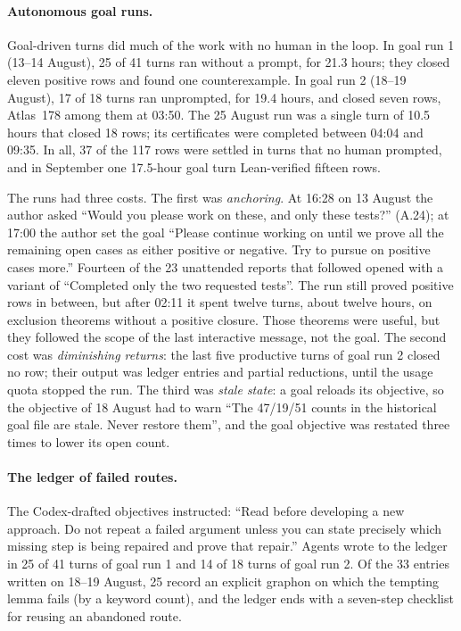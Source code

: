 \documentclass[11pt,a4paper]{article}
\begin{document}
\paragraph{Autonomous goal runs.} Goal-driven turns did much of the work with no human in the loop. In goal run
1 (13--14 August), 25 of 41 turns ran without a prompt, for 21.3 hours; they closed eleven positive rows and
found one counterexample. In goal run 2 (18--19 August), 17 of 18 turns ran unprompted, for 19.4 hours, and
closed seven rows, Atlas~178 among them at 03:50. The 25 August run was a single turn of 10.5 hours that closed
18 rows; its certificates were completed between 04:04 and 09:35. In all, 37 of the 117 rows were settled in
turns that no human prompted, and in September one 17.5-hour goal turn Lean-verified fifteen rows.

The runs had three costs. The first was \emph{anchoring}. At 16:28 on 13 August the author asked ``Would you
please work on these, and only these tests?'' (A.24); at 17:00 the author set the goal ``Please continue working
on until we prove all the remaining open cases as either positive or negative. Try to pursue on positive cases
more.'' Fourteen of the 23 unattended reports that followed opened with a variant of ``Completed only the two
requested tests''. The run still proved positive rows in between, but after 02:11 it spent twelve turns, about
twelve hours, on exclusion theorems without a positive closure. Those theorems were useful, but they followed
the scope of the last interactive message, not the goal. The second cost was \emph{diminishing returns}: the
last five productive turns of goal run 2 closed no row; their output was ledger entries and partial reductions,
until the usage quota stopped the run. The
third was \emph{stale state}: a goal reloads its objective, so the objective of 18 August had to warn ``The
47/19/51 counts in the historical goal file are stale. Never restore them'', and the goal objective was
restated three times to lower its open count.

\paragraph{The ledger of failed routes.} The Codex-drafted objectives instructed: ``Read
 before developing a new approach. Do not repeat a failed argument unless you
can state precisely which missing step is being repaired and prove that repair.'' Agents wrote to the ledger in
25 of 41 turns of goal run 1 and 14 of 18 turns of goal run 2. Of the 33 entries written on 18--19 August, 25
record an explicit graphon on which the tempting lemma fails (by a keyword count), and the ledger ends with a
seven-step checklist for reusing an abandoned route.
\end{document}
